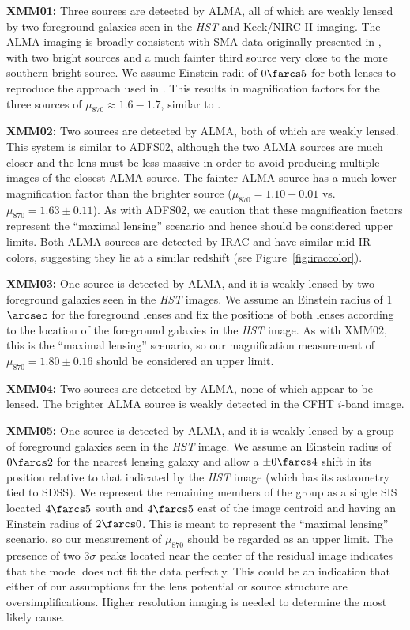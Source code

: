 \documentclass[iop]{emulateapj}
\begin{document}
{\bf XMM01:} Three sources are detected by ALMA, all of which are weakly lensed
by two foreground galaxies seen in the {\it HST} and Keck/NIRC-II imaging.  The
ALMA imaging is broadly consistent with SMA data originally presented in
\citet{Fu:2013lr}, with two bright sources and a much fainter third source very
close to the more southern bright source.  We assume Einstein radii of
$0\farcs5$ for both lenses to reproduce the approach used in \citet{Fu:2013lr}.
This results in magnification factors for the three sources of $\mu_{870}
\approx 1.6 - 1.7$, similar to \citet{Fu:2013lr}.

{\bf XMM02:} Two sources are detected by ALMA, both of which are weakly lensed.
This system is similar to ADFS02, although the two ALMA sources are much closer
and the lens must be less massive in order to avoid producing multiple images
of the closest ALMA source.  The fainter ALMA source has a much lower
magnification factor than the brighter source ($\mu_{870} = 1.10 \pm 0.01$ vs.
$\mu_{870} = 1.63 \pm 0.11$).  As with ADFS02, we caution that these
magnification factors represent the ``maximal lensing'' scenario and hence
should be considered upper limits.  Both ALMA sources are detected by IRAC and
have similar mid-IR colors, suggesting they lie at a similar redshift (see
Figure~\ref{fig:iraccolor}).

{\bf XMM03:} One source is detected by ALMA, and it is weakly lensed by two
foreground galaxies seen in the {\it HST} images.  We assume an Einstein radius
of 1$\arcsec$ for the foreground lenses and fix the positions of both lenses
according to the location of the foreground galaxies in the {\it HST} image.
As with XMM02, this is the ``maximal lensing'' scenario, so our magnification
measurement of $\mu_{870} = 1.80 \pm 0.16$ should be considered an upper limit.

{\bf XMM04:} Two sources are detected by ALMA, none of which appear to be
lensed.  The brighter ALMA source is weakly detected in the CFHT $i$-band
image.  

{\bf XMM05:} One source is detected by ALMA, and it is weakly lensed by a group
of foreground galaxies seen in the {\it HST} image.  We assume an Einstein
radius of $0\farcs2$ for the nearest lensing galaxy and allow a $\pm0\farcs4$
shift in its position relative to that indicated by the {\it HST} image (which
has its astrometry tied to SDSS).  We represent the remaining members of the
group as a single SIS located $4\farcs5$ south and $4\farcs5$ east of the image
centroid and having an Einstein radius of $2\farcs0$.  This is meant to
represent the ``maximal lensing'' scenario, so our measurement of $\mu_{870}$
should be regarded as an upper limit.  The presence of two $3\sigma$ peaks
located near the center of the residual image indicates that the model does not
fit the data perfectly.  This could be an indication that either of our
assumptions for the lens potential or source structure are oversimplifications.
Higher resolution imaging is needed to determine the most likely cause.
\end{document}
